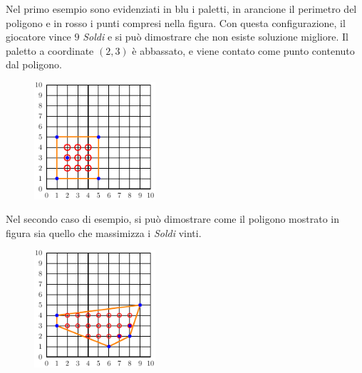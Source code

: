 






\Examples

\begin{example}
\end{example}


\Explanation

Nel primo esempio sono evidenziati in blu i paletti, in arancione il perimetro del poligono e in
rosso i punti compresi nella figura.
Con questa configurazione, il giocatore vince $9$ \textit{Soldi} e si può dimostrare che non esiste soluzione migliore.
Il paletto a coordinate $(2,3)$ è abbassato, e viene contato come punto contenuto dal poligono.

\begin{figure}[h]
    \centering
    \includegraphics[width=0.4\textwidth]{./asy_examples/example0.pdf}
\end{figure}

Nel secondo caso di esempio, si può dimostrare come il poligono mostrato in figura sia
quello che massimizza i \textit{Soldi} vinti.

\begin{figure}[h]
    \centering
    \includegraphics[width=0.4\textwidth]{./asy_examples/example1.pdf}
\end{figure}